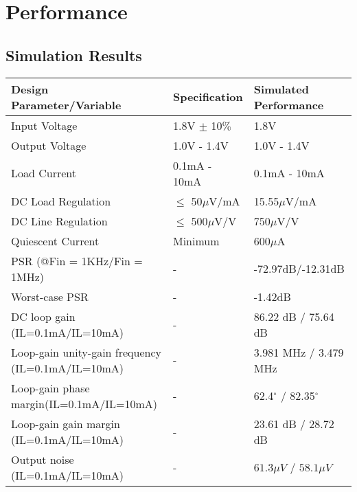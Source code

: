 \documentclass{report}
\begin{document}
        

    \chapter{Performance}

    \section{Simulation Results}
    \begin{center}
        \begin{tabular}{|m{25em}|m{7em}|m{12em}|}
            \hline
            \textbf{Design Parameter/Variable} & \textbf{Specification} & \textbf{Simulated Performance} \\
            \hline
            \hline
            Input Voltage & 1.8V $\pm$ 10$\%$ & 1.8V \\
            \hline
            Output Voltage & 1.0V - 1.4V  & 1.0V - 1.4V \\
            \hline
            Load Current & 0.1mA - 10mA & 0.1mA - 10mA \\
            \hline
            DC Load Regulation & $\leq$ 50$\mu$V/mA & 15.55$\mu$V/mA\\
            \hline
            DC Line Regulation & $\leq$ 500$\mu$V/V & 750$\mu$V/V\\
            \hline
            Quiescent Current & Minimum & 600$\mu$A \\
            \hline
            PSR (@Fin = 1KHz/Fin = 1MHz) & - & -72.97dB/-12.31dB\\
            \hline
            Worst-case PSR & - & -1.42dB\\
            \hline
            DC loop gain (IL=0.1mA/IL=10mA) & - & 86.22 dB / 75.64 dB\\
            \hline
            Loop-gain unity-gain frequency (IL=0.1mA/IL=10mA) & - & 3.981 MHz / 3.479 MHz\\
            \hline
            Loop-gain phase margin(IL=0.1mA/IL=10mA) & - & 62.4$^{\circ}$ / 82.35$^{\circ}$  \\
            \hline
            Loop-gain gain margin (IL=0.1mA/IL=10mA) & - & 23.61 dB / 28.72 dB \\ 
            \hline
            Output noise (IL=0.1mA/IL=10mA) & - & $61.3\mu V$ / $58.1 \mu V$\\
            \hline

            \end{tabular}
    \end{center}
\end{document}
